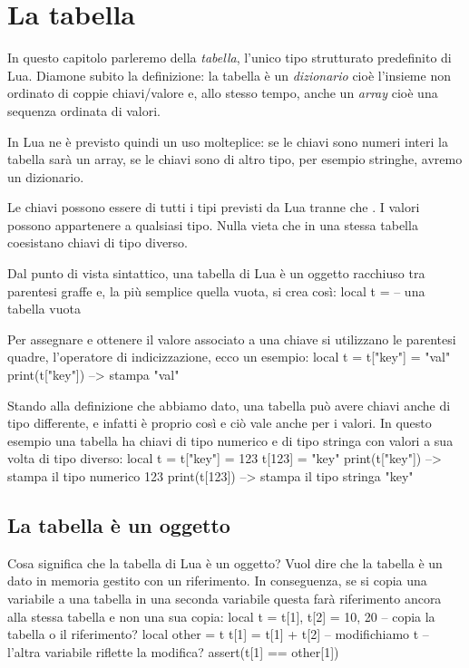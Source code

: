 

\chapter{La tabella}
\label{iChTabella}

In questo capitolo parleremo della \emph{tabella}, l'unico tipo strutturato
predefinito di Lua. Diamone subito la definizione: la tabella è un
\emph{dizionario} cioè l'insieme non ordinato di coppie chiavi/valore e, allo
stesso tempo, anche un \emph{array} cioè una sequenza ordinata di valori.

In Lua ne è previsto quindi un uso molteplice: se le chiavi sono numeri interi
la tabella sarà un array, se le chiavi sono di altro tipo, per esempio stringhe,
avremo un dizionario.

Le chiavi possono essere di tutti i tipi previsti da Lua tranne che . I
valori possono appartenere a qualsiasi tipo. Nulla vieta che in una stessa
tabella coesistano chiavi di tipo diverso.

Dal punto di vista sintattico, una tabella di Lua è un oggetto racchiuso tra
parentesi graffe e, la più semplice quella vuota, si crea così:
\lines
local t = {} -- una tabella vuota
\endlines
{}

Per assegnare e ottenere il valore associato a una chiave si utilizzano le
parentesi quadre, l'operatore di indicizzazione, ecco un esempio:
\lines
local t = {}
t["key"] = "val"
print(t["key"]) --> stampa "val"
\endlines
{}

Stando alla definizione che abbiamo dato, una tabella può avere chiavi anche di
tipo differente, e infatti è proprio così e ciò vale anche per i valori. In
questo esempio una tabella ha chiavi di tipo numerico e di tipo stringa con
valori a sua volta di tipo diverso:
\lines
local t = {}
t["key"] = 123
t[123] = "key"
print(t["key"]) --> stampa il tipo numerico 123
print(t[123])   --> stampa il tipo stringa "key"
\endlines
{}


\section{La tabella è un oggetto}

Cosa significa che la tabella di Lua è un oggetto? Vuol dire che la tabella è
un dato in memoria gestito con un riferimento. In conseguenza, se si copia una
variabile a una tabella in una seconda variabile questa farà riferimento ancora
alla stessa tabella e non una sua copia:
\lines
local t = {}
t[1], t[2] = 10, 20
-- copia la tabella o il riferimento?
local other = t
t[1] = t[1] + t[2] -- modifichiamo t
-- l'altra variabile riflette la modifica?
assert(t[1] == other[1])
\endlines
{}

